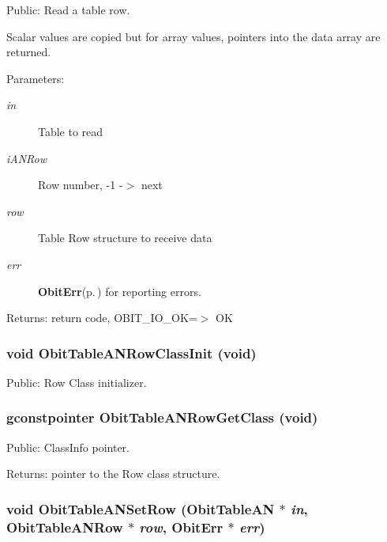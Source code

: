 Public: Read a table row. 

Scalar values are copied but for array values, pointers into the data array are returned. \begin{Desc}
\item[Parameters:]
\begin{description}
\item[{\em in}]Table to read \item[{\em i\-ANRow}]Row number, -1 -$>$ next \item[{\em row}]Table Row structure to receive data \item[{\em err}]{\bf Obit\-Err}{\rm (p.\,\pageref{structObitErr})} for reporting errors. \end{description}
\end{Desc}
\begin{Desc}
\item[Returns:]return code, OBIT\_\-IO\_\-OK=$>$ OK \end{Desc}
\subsubsection{\setlength{\rightskip}{0pt plus 5cm}void Obit\-Table\-ANRow\-Class\-Init (void)}\label{ObitTableAN_8h_a7}


Public: Row Class initializer. 

\subsubsection{\setlength{\rightskip}{0pt plus 5cm}gconstpointer Obit\-Table\-ANRow\-Get\-Class (void)}\label{ObitTableAN_8h_a9}


Public: Class\-Info pointer. 

\begin{Desc}
\item[Returns:]pointer to the Row class structure. \end{Desc}
\subsubsection{\setlength{\rightskip}{0pt plus 5cm}void Obit\-Table\-ANSet\-Row ({\bf Obit\-Table\-AN} $\ast$ {\em in}, {\bf Obit\-Table\-ANRow} $\ast$ {\em row}, {\bf Obit\-Err} $\ast$ {\em err})}\label{ObitTableAN_8h_a19}


